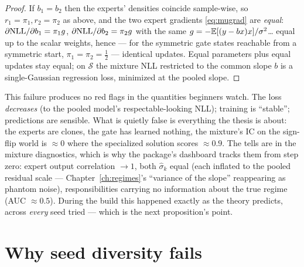\begin{proof}
If $b_1 = b_2$ then the experts' densities coincide sample-wise, so
$r_1 = \pi_1, r_2 = \pi_2$ as above, and the two expert gradients
\eqref{eq:mugrad} are \emph{equal}:
$\partial \mathrm{NLL}/\partial b_1 = \pi_1 g$, $\partial \mathrm{NLL}/\partial b_2 =
\pi_2 g$ with the same $g = -\mathbb{E}[(y - bx)x]/\sigma^2$\dots{} equal up to
the scalar weights, hence --- for the symmetric gate states reachable
from a symmetric start, $\pi_1 = \pi_2 = \tfrac12$ --- identical
updates. Equal parameters plus equal updates stay equal; on
$\mathcal{S}$ the mixture NLL restricted to the common slope $b$ is a
single-Gaussian regression loss, minimized at the pooled slope.
\end{proof}

\begin{whatbreaks}
This failure produces no red flags in the quantities beginners watch.
The loss \emph{decreases} (to the pooled model's respectable-looking
NLL); training is ``stable''; predictions are sensible. What is quietly
false is everything the thesis is about: the experts are clones, the
gate has learned nothing, the mixture's IC on the sign-flip world is
$\approx 0$ where the specialized solution scores $\approx 0.9$. The
tells are in the mixture diagnostics, which is why the package's
dashboard tracks them from step zero: expert output correlation
$\to 1$, both $\hat\sigma_k$ equal (each inflated to the pooled residual
scale --- Chapter~\ref{ch:regimes}'s ``variance of the slope''
reappearing as phantom noise), responsibilities carrying no information
about the true regime (AUC $\approx 0.5$). During the build this
happened exactly as the theory predicts, across \emph{every} seed tried
--- which is the next proposition's point.
\end{whatbreaks}

\section{Why seed diversity fails}\label{sec:seedsfail}

